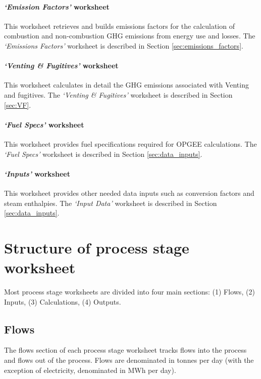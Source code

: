 \documentclass[11pt]{report}
\newcommand{\sheet}[1]{\textit{`{#1}'}}
\begin{document}
\paragraph{\sheet{Emission Factors} worksheet} This worksheet retrieves and builds emissions factors for the calculation of combustion and non-combustion GHG emissions from energy use and losses. The \sheet{Emissions Factors} worksheet is described in Section \ref{sec:emissions_factors}.

\paragraph{\sheet{Venting \& Fugitives} worksheet} This worksheet calculates in detail the GHG emissions associated with Venting and fugitives. The \sheet{Venting \& Fugitives} worksheet is described in Section \ref{sec:VF}.

\paragraph{\sheet{Fuel Specs} worksheet} This worksheet provides fuel specifications required for OPGEE calculations. The \sheet{Fuel Specs} worksheet is described in Section \ref{sec:data_inputs}.

\paragraph{\sheet{Inputs} worksheet} This worksheet provides other needed data inputs such as conversion factors and steam enthalpies. The \sheet{Input Data} worksheet is described in Section \ref{sec:data_inputs}.

\vspace{0.1in}


\clearpage

\section{Structure of process stage worksheet}
Most process stage worksheets are divided into four main sections: (1) Flows, (2) Inputs, (3) Calculations, (4) Outputs. 

\subsection{Flows} 
The flows section of each process stage worksheet tracks flows into the process and flows out of the process. Flows are denominated in tonnes per day (with the exception of electricity, denominated in MWh per day).
\end{document}
